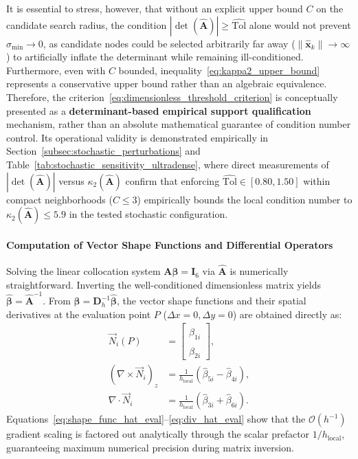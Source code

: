 \documentclass[preprint,12pt]{elsarticle}
\begin{document}
It is essential to stress, however, that without an explicit upper bound $C$ on the candidate search radius, the condition $|\det(\widehat{\mathbf{A}})| \ge \widehat{\mathrm{Tol}}$ alone would not prevent $\sigma_{\min} \to 0$, as candidate nodes could be selected arbitrarily far away ($\|\hat{\mathbf{x}}_k\| \to \infty$) to artificially inflate the determinant while remaining ill-conditioned. Furthermore, even with $C$ bounded, inequality~\eqref{eq:kappa2_upper_bound} represents a conservative upper bound rather than an algebraic equivalence. Therefore, the criterion~\eqref{eq:dimensionless_threshold_criterion} is conceptually presented as a \textbf{determinant-based empirical support qualification} mechanism, rather than an absolute mathematical guarantee of condition number control. Its operational validity is demonstrated empirically in Section~\ref{subsec:stochastic_perturbations} and Table~\ref{tab:stochastic_sensitivity_ultradense}, where direct measurements of $|\det(\widehat{\mathbf{A}})|$ versus $\kappa_2(\widehat{\mathbf{A}})$ confirm that enforcing $\widehat{\mathrm{Tol}} \in [0.80, 1.50]$ within compact neighborhoods ($C \le 3$) empirically bounds the local condition number to $\kappa_2(\widehat{\mathbf{A}}) \le 5.9$ in the tested stochastic configuration.

\paragraph{Computation of Vector Shape Functions and Differential Operators}
Solving the linear collocation system $\mathbf{A} \boldsymbol{\beta} = \mathbf{I}_6$ via $\widehat{\mathbf{A}}$ is numerically straightforward. Inverting the well-conditioned dimensionless matrix yields $\widehat{\boldsymbol{\beta}} = \widehat{\mathbf{A}}^{-1}$. From $\boldsymbol{\beta} = \mathbf{D}_h^{-1} \widehat{\boldsymbol{\beta}}$, the vector shape functions and their spatial derivatives at the evaluation point $P$ ($\Delta x = 0, \Delta y = 0$) are obtained directly as:
\begin{align}
\vec{N}_i(P) &= \begin{bmatrix} \hat{\beta}_{1i} \\ \hat{\beta}_{2i} \end{bmatrix}, \label{eq:shape_func_hat_eval} \\
(\nabla \times \vec{N}_i)_z &= \frac{1}{h_{\mathrm{local}}} \left( \hat{\beta}_{5i} - \hat{\beta}_{4i} \right), \label{eq:curl_hat_eval} \\
\nabla \cdot \vec{N}_i &= \frac{1}{h_{\mathrm{local}}} \left( \hat{\beta}_{3i} + \hat{\beta}_{6i} \right). \label{eq:div_hat_eval}
\end{align}
Equations~\eqref{eq:shape_func_hat_eval}--\eqref{eq:div_hat_eval} show that the $\mathcal{O}(h^{-1})$ gradient scaling is factored out analytically through the scalar prefactor $1/h_{\mathrm{local}}$, guaranteeing maximum numerical precision during matrix inversion.
\end{document}
